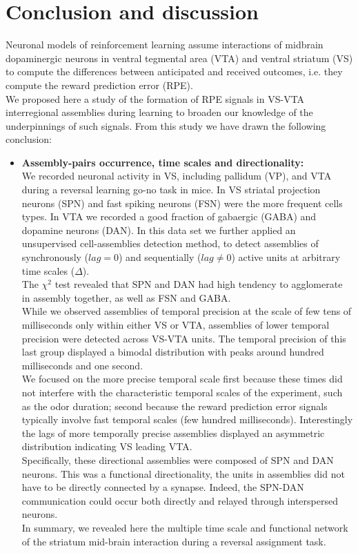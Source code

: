 \chapter{Conclusion and discussion}
\label{chap:Conclusion}
Neuronal models of reinforcement learning assume interactions of midbrain dopaminergic neurons in ventral tegmental area (VTA) and ventral striatum (VS) to compute the differences between anticipated and received outcomes, i.e. they compute the reward prediction error (RPE).\\We proposed here a study of the formation of RPE signals in VS-VTA interregional assemblies during learning to broaden our knowledge of the underpinnings of such signals. From this study we have drawn the following conclusion:
\begin{itemize}
    \item \textbf{Assembly-pairs occurrence, time scales and directionality:}\\We recorded neuronal activity in VS, including pallidum (VP), and VTA during a reversal learning go-no task in mice. In VS striatal projection neurons (SPN) and fast spiking neurons (FSN) were the more frequent cells types. In VTA we recorded a good fraction of gabaergic (GABA) and dopamine neurons (DAN). In this data set we further applied an unsupervised cell-assemblies detection method, to detect assemblies of synchronously ($lag=0$) and sequentially ($lag\neq0$) active units at arbitrary time scales ($\Delta$).\\The $\chi^2$ test revealed that SPN and DAN had high tendency to agglomerate in assembly together, as well as FSN and GABA.\\While we observed assemblies of temporal precision at the scale of few tens of milliseconds only within either VS or VTA, assemblies of lower temporal precision were detected across VS-VTA units. The temporal precision of this last group displayed a bimodal distribution with peaks around hundred milliseconds and one second.\\We focused on the more precise temporal scale first because these times did not interfere with the characteristic temporal scales of the experiment, such as the odor duration; second because the reward prediction error signals typically involve fast temporal scales (few hundred milliseconds). Interestingly the lags of more temporally precise assemblies displayed an asymmetric distribution indicating VS leading VTA.\\ Specifically, these directional assemblies were composed of SPN and DAN neurons. This was a functional directionality, the units in assemblies did not have to be directly connected by a synapse. Indeed, the SPN-DAN communication could occur both directly and relayed through interspersed neurons.\\In summary, we revealed here the multiple time scale and functional network of the striatum mid-brain interaction during a reversal assignment task.  

\end{itemize}
